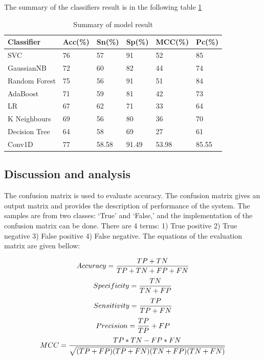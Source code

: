 \documentclass[letterpaper, 10 pt, conference]{ieeeconf}  %
\begin{document}
The summary of the classifiers result is in the following table \ref{table_3}
\begin{table}[ht]
\caption{Summary of model result}
\label{table_3}
\begin{center}
    \begin{tabular}{|p{1.4cm}|p{1cm}|p{1cm}|p{1cm}|p{1cm}|p{1cm}|}
\hline
Classifier & Acc(\%) & Sn(\%) & Sp(\%) & MCC(\%) & Pc(\%) \\
\hline
SVC & 76  & 57 & 91 & 52 & 85\\
\hline
GaussianNB & 72 & 60 & 82 & 44 & 74\\
\hline
Random Forest & 75 & 56 & 91 & 51 & 84\\
\hline
AdaBoost & 71 & 59 & 81 & 42 & 73\\
\hline
LR & 67 & 62 & 71 & 33 & 64\\
\hline
K Neighbours & 69 & 56 & 80 & 36 & 70\\
\hline
Decision Tree & 64 & 58 & 69 & 27 & 61\\
\hline
Conv1D  & 77  & 58.58 & 91.49 &  53.98 & 85.55\\
\hline
\end{tabular}
\end{center}
\end{table}

\subsection{Discussion and analysis}
The confusion matrix is used to evaluate accuracy. The confusion matrix gives an output matrix and provides the description of performance of the system. The samples are from two classes: ‘True’ and ‘False,’ and the implementation of the confusion matrix can be done.
There are 4 terms: 1) True positive 2) True negative 3) False positive 4) False negative.
The equations of the evaluation matrix are given bellow: 


\begin{equation}
    Accuracy = \frac{TP+TN}{TP+TN+FP+FN} \newline
\end{equation}
\begin{equation}
    Specificity = \frac{TN}{TN+FP} \newline
\end{equation}
\begin{equation}
    Sensitivity = \frac{TP}{TP+FN} \newline
\end{equation}
\begin{equation}
    Precision  = \frac{TP}{TP} +FP \newline
\end{equation}
\begin{equation}
    MCC = \frac{{TP}*{TN} - {FP}*{FN}}{\sqrt{(TP+FP)(TP+FN)(TN+FP)(TN+FN)}} \newline
\end{equation}
\\
\end{document}
